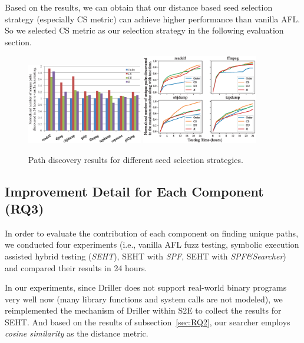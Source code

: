 \documentclass{cta-author}
\begin{document}
Based on the results, we can obtain that our distance based seed 
selection strategy (especially CS metric) can achieve 
higher performance than vanilla AFL. So we selected CS metric as 
our selection strategy in the following evaluation section.

\begin{figure}[!t]
	\includegraphics[width=0.45\textwidth, trim={0.2cm 0.4cm 0cm 0cm}, clip]
	{path-discovery.eps}
	\includegraphics[width=0.45\textwidth, trim={0.15cm 0.1cm 1.5cm 0.8cm}, clip]
	{path-time-detail.eps} 
	\label{fig1}
	\caption{Path discovery results for different seed selection strategies.}
	\label{path-detail}
\end{figure} 
		
\subsection{Improvement Detail for Each Component (RQ3)} \label{sec:RQ3}
In order to evaluate the contribution of each component on finding 
unique paths, we conducted four experiments (i.e., vanilla AFL fuzz testing, 
symbolic execution assisted hybrid testing (\textit{SEHT}), SEHT with \textit{SPF}, 
SEHT with \textit{SPF\&Searcher}) and compared their results in 24 hours.

In our experiments, since Driller \cite{stephens2016driller} does not support 
real-world binary programs very well now (many library functions and system 
calls are not modeled), we reimplemented the mechanism of Driller within 
S2E to collect the results for SEHT. And based on the results of 
subsection~\ref{sec:RQ2}, our searcher employs \emph{cosine similarity} 
as the distance metric.
\end{document}
